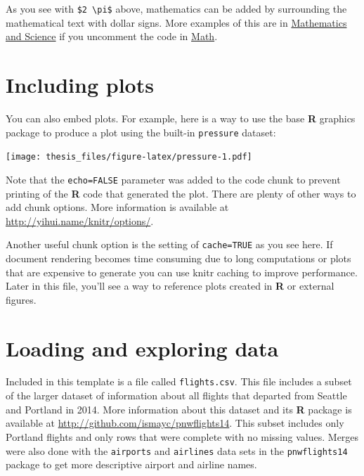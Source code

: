 \documentclass[12pt,twoside]{reedthesis}
\begin{document}
As you see with \texttt{\$2\ \textbackslash{}pi\$} above, mathematics can be added by surrounding the mathematical text with dollar signs. More examples of this are in \protect\hyperlink{math-sci}{Mathematics and Science} if you uncomment the code in \protect\hyperlink{math}{Math}.

\hypertarget{including-plots}{%
\section{Including plots}\label{including-plots}}

You can also embed plots. For example, here is a way to use the base \textbf{R} graphics package to produce a plot using the built-in \texttt{pressure} dataset:

\texttt{[image: thesis\_files/figure-latex/pressure-1.pdf]}

Note that the \texttt{echo=FALSE} parameter was added to the code chunk to prevent printing of the \textbf{R} code that generated the plot. There are plenty of other ways to add chunk options. More information is available at \url{http://yihui.name/knitr/options/}.

Another useful chunk option is the setting of \texttt{cache=TRUE} as you see here. If document rendering becomes time consuming due to long computations or plots that are expensive to generate you can use knitr caching to improve performance. Later in this file, you'll see a way to reference plots created in \textbf{R} or external figures.

\hypertarget{loading-and-exploring-data}{%
\section{Loading and exploring data}\label{loading-and-exploring-data}}

Included in this template is a file called \texttt{flights.csv}. This file includes a subset of the larger dataset of information about all flights that departed from Seattle and Portland in 2014. More information about this dataset and its \textbf{R} package is available at \url{http://github.com/ismayc/pnwflights14}. This subset includes only Portland flights and only rows that were complete with no missing values. Merges were also done with the \texttt{airports} and \texttt{airlines} data sets in the \texttt{pnwflights14} package to get more descriptive airport and airline names.
\end{document}
